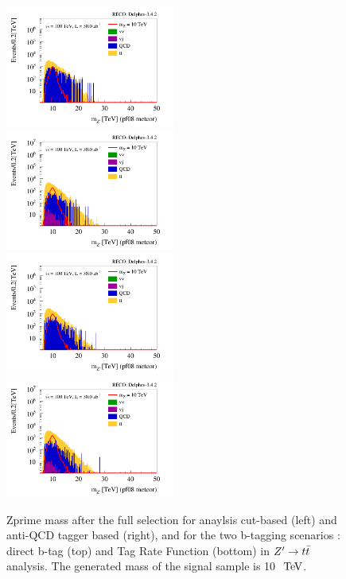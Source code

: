 \documentclass{cernrep}
\begin{document}
\begin{figure}[!htb]\centering
\includegraphics[width=0.495\textwidth]{Fig/Zptt/cut/Mj1j2_pf08_MetCorr_sel4_nostack_log.png}
\includegraphics[width=0.495\textwidth]{Fig/Zptt/tagger/Mj1j2_pf08_MetCorr_sel4_nostack_log.png}
\includegraphics[width=0.495\textwidth]{Fig/Zptt/cut/Mj1j2_pf08_MetCorr_sel2_nostack_log_TRFtag.png}
\includegraphics[width=0.495\textwidth]{Fig/Zptt/tagger/Mj1j2_pf08_MetCorr_sel2_nostack_log_TRFtag.png}
\caption{Zprime mass after the full selection for anaylsis cut-based (left) and anti-QCD tagger based (right), and for the two b-tagging scenarios : direct b-tag (top) and Tag Rate Function (bottom) in $Z^{\prime} \rightarrow t\bar{t}$ analysis. The generated mass of the signal sample is 10 $\TeV$.}
\label{fig:Zptt_mass_sel_final}
\end{figure}
\end{document}
